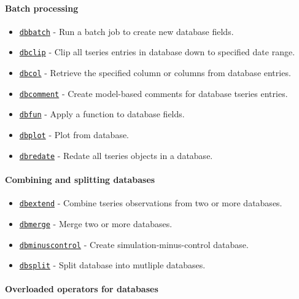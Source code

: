 \paragraph{Batch processing}\label{batch-processing}

\begin{itemize}
\itemsep1pt\parskip0pt
\item
  \href{dbase/dbbatch}{\texttt{dbbatch}} - Run a batch job to create new
  database fields.
\item
  \href{dbase/dbclip}{\texttt{dbclip}} - Clip all tseries entries in
  database down to specified date range.
\item
  \href{dbase/dbcol}{\texttt{dbcol}} - Retrieve the specified column or
  columns from database entries.
\item
  \href{dbase/dbcomment}{\texttt{dbcomment}} - Create model-based
  comments for database tseries entries.
\item
  \href{dbase/dbfun}{\texttt{dbfun}} - Apply a function to database
  fields.
\item
  \href{dbase/dbplot}{\texttt{dbplot}} - Plot from database.
\item
  \href{dbase/dbredate}{\texttt{dbredate}} - Redate all tseries objects
  in a database.
\end{itemize}

\paragraph{Combining and splitting
databases}\label{combining-and-splitting-databases}

\begin{itemize}
\itemsep1pt\parskip0pt
\item
  \href{dbase/dbextend}{\texttt{dbextend}} - Combine tseries
  observations from two or more databases.
\item
  \href{dbase/dbmerge}{\texttt{dbmerge}} - Merge two or more databases.
\item
  \href{dbase/dbminuscontrol}{\texttt{dbminuscontrol}} - Create
  simulation-minus-control database.
\item
  \href{dbase/dbsplit}{\texttt{dbsplit}} - Split database into mutliple
  databases.
\end{itemize}

\paragraph{Overloaded operators for
databases}\label{overloaded-operators-for-databases}

